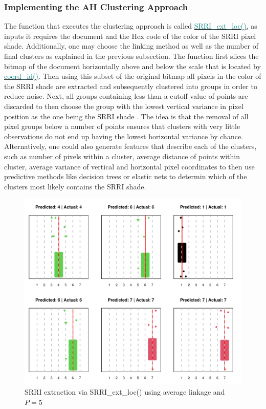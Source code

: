 \documentclass[aodsor,preprint]{imsart}
\numberwithin{equation}{section}
\theoremstyle{plain}
\begin{document}
\subsubsection{Implementing the AH Clustering Approach}
The function that executes the clustering approach is called \href{https://github.com/Base-R-Best-R/KID/blob/main/Code/Package/KIDs/R/SRRI_ext_loc.R}{\textcolor{teal}{SRRI\_ext\_loc()}}, as inputs it requires the document and the Hex code of the color of the SRRI pixel shade. Additionally, one may choose the linking method as well as the number of final clusters as explained in the previous subsection. The function first slices the bitmap of the document horizontally above and below the scale that is located by \href{https://github.com/Base-R-Best-R/KID/blob/main/Code/Package/KIDs/R/coord_id.R}{\textcolor{teal}{coord\_id()}}. Then using this subset of the original bitmap all pixels in the color of the SRRI shade are extracted and subsequently clustered into groups in order to reduce noise. Next, all groups containing less than a cutoff value of points are discarded to then choose the group with the lowest vertical variance in pixel position as the one being the SRRI shade \citep{datatable}. The idea is that the removal of all pixel groups below a number of points ensures that clusters with very little observations do not end up having the lowest horizontal variance by chance. Alternatively, one could also generate features that describe each of the clusters, such as number of pixels within a cluster, average distance of points within cluster, average variance of vertical and horizontal pixel coordinates to then use predictive methods like decision trees or elastic nets to determin which of the clusters most likely contains the SRRI shade.

\begin{figure}[H]
	\includegraphics[width = 12cm]{Ersteextr.pdf}
	\caption{SRRI extraction via SRRI\_ext\_loc() using average linkage and $P = 5$}
	\label{fig6}
\end{figure}
\end{document}
